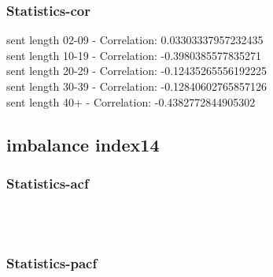 \documentclass{article}%
\begin{document}
%
\newpage%
\subsubsection{Statistics{-}cor}%
\label{ssubsec:Statistics{-}cor}%
\noindent%
sent length 02-09 - Correlation: 0.03303337957232435\\%
sent length 10-19 - Correlation: -0.3980385577835271\\%
sent length 20-29 - Correlation: -0.12435265556192225\\%
sent length 30-39 - Correlation: -0.12840602765857126\\%
sent length 40+ - Correlation: -0.4382772844905302\\

%
\newpage

%
\subsection{imbalance index14}%
\label{subsec:imbalanceindex14}%
\subsubsection{Statistics{-}acf}%
\label{ssubsec:Statistics{-}acf}%


\begin{figure}[ht]%
\centering%
\setlength{\abovecaptionskip}{-35pt}%
%
%
\\%
%
%
\\%
%
\end{figure}

%
\newpage%
\subsubsection{Statistics{-}pacf}%
\label{ssubsec:Statistics{-}pacf}%
\end{document}
